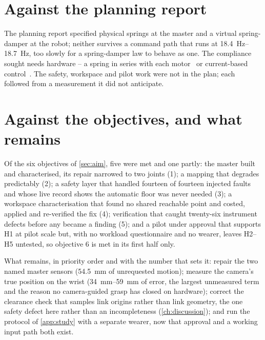 \section{Against the planning report}

The planning report specified physical springs at the master and a virtual
spring-damper at the robot; neither survives a command path that runs at
\SIrange{18.4}{18.7}{\hertz}, too slowly for a spring-damper law to behave as
one. The compliance sought needs hardware -- a spring in series with each
motor~\cite{toubar2022sea,lee2019sea} or current-based
control~\cite{dewolde2024impedance}. The safety, workspace and pilot work
were not in the plan; each followed from a measurement it did not
anticipate.

\section{Against the objectives, and what remains}
\label{sec:against-objectives}

Of the six objectives of \cref{sec:aim}, five were met and one partly: the
master built and characterised, its repair narrowed to two joints (1); a
mapping that degrades predictably (2); a safety layer that handled fourteen
of fourteen injected faults and whose live record shows the automatic floor
was never needed (3); a workspace characterisation that
found no shared reachable point and costed, applied and re-verified the fix
(4); verification that caught twenty-six instrument defects before any
became a finding (5); and a pilot under
approval that supports H1 at pilot scale but, with no workload
questionnaire and no wearer, leaves H2--H5 untested, so objective 6 is met
in its first half only.

What remains, in priority order and with the number that sets it: repair
the two named master sensors (\SI{54.5}{\milli\metre} of unrequested
motion); measure the camera's true position on the wrist
(\SIrange{34}{59}{\milli\metre} of error, the largest unmeasured term and
the reason no camera-guided grasp has closed on hardware); correct the
clearance check that samples link origins rather than link geometry, the
one safety defect here rather than an incompleteness (\cref{ch:discussion});
and run the protocol of \cref{app:study} with a separate wearer, now that
approval and a working input path both exist.
